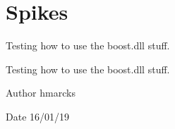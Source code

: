 \hypertarget{group__spikes}{}\section{Spikes}
\label{group__spikes}


Testing how to use the boost.\+dll stuff.  


Testing how to use the boost.\+dll stuff. 

\begin{DoxyAuthor}{Author}
hmarcks
\end{DoxyAuthor}
\begin{DoxyDate}{Date}
16/01/19 
\end{DoxyDate}
